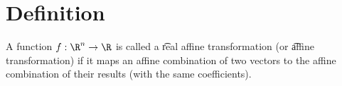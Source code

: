 
\section*{Definition}

A function $f: \R ^n \to \R $ is called a \t{real affine transformation} (or \t{affine transformation}) if it maps an affine combination of two vectors to the affine combination of their results (with the same coefficients).


\blankpage
